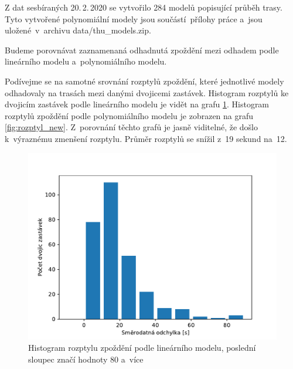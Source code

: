 \bigbreak

Z dat sesbíraných 20.\,2.\,2020 se vytvořilo 284 modelů popisující průběh trasy. Tyto vytvořené polynomiální modely jsou součástí přílohy práce a~jsou uložené v~archivu data/thu\_models.zip.


\bigbreak

Budeme porovnávat zaznamenaná odhadnutá zpoždění mezi odhadem podle lineárního modelu a~polynomiálního modelu.

\bigbreak

Podívejme se na samotné srovnání rozptylů zpoždění, které jednotlivé modely odhadovaly na trasách mezi danými dvojicemi zastávek. Histogram rozptylů ke dvojicím zastávek podle lineárního modelu je vidět na grafu \ref{fig:rozptyl_old}. Histogram rozptylů zpoždění podle polynomiálního modelu je zobrazen na grafu \ref{fig:rozptyl_new}. Z~porovnání těchto grafů je jasně viditelné, že došlo k~výraznému zmenšení rozptylu. Průměr rozptylů se snížil z~19 sekund na~12.


\begin{figure}
   \centering
 \includegraphics[width=\linewidth]{../img/rozptyl_old}
 \caption{Histogram rozptylu zpoždění podle lineárního modelu, poslední sloupec značí hodnoty 80 a~více}
 \label{fig:rozptyl_old}
\end{figure}


